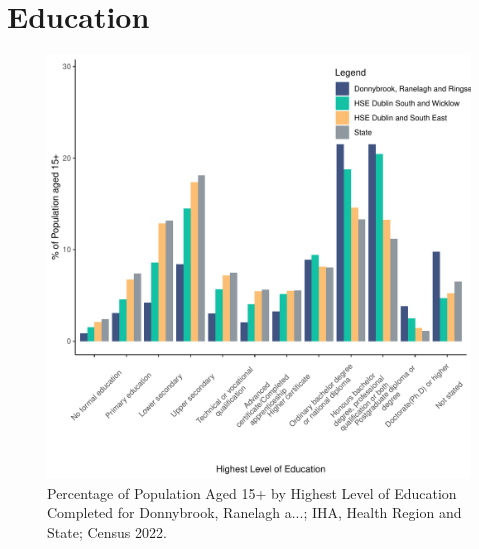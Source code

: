 \documentclass{article}
\begin{document}
\section{Education}\label{sect:Edu}
\begin{figure}[H]
	\centering
	\includegraphics[width = 120mm]{../figures/EduED.pdf}
	\caption{Percentage of Population Aged 15+ by Highest Level of Education Completed for Donnybrook, Ranelagh a...; IHA, Health Region and State; Census 2022.}
	\label{fig:vbnv}
	\end{figure}
\end{document}

